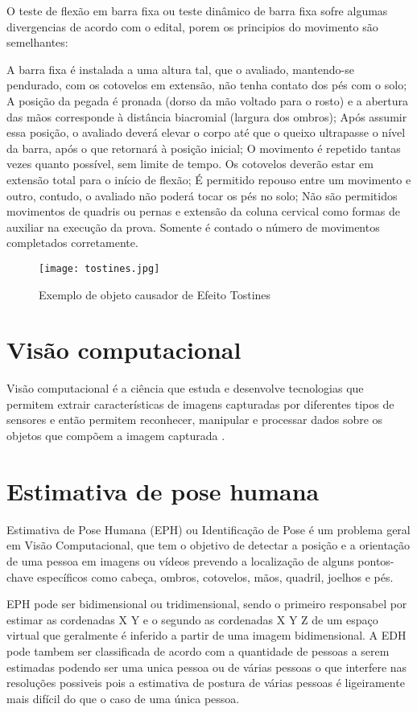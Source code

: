 O teste de flexão em barra fixa ou teste dinâmico de barra fixa sofre algumas divergencias de acordo com o edital, porem os principios do movimento são semelhantes:

A barra fixa é instalada a uma altura tal, que o avaliado, mantendo-se pendurado, com os cotovelos em extensão, não tenha contato dos pés com o solo;
A posição da pegada é pronada (dorso da mão voltado para o rosto) e a abertura das mãos corresponde à distância biacromial (largura dos ombros);
Após assumir essa posição, o avaliado deverá elevar o corpo até que o queixo ultrapasse o nível da barra, após o que retornará à posição inicial;
O movimento é repetido tantas vezes quanto possível, sem limite de tempo.
Os cotovelos deverão estar em extensão total para o início de flexão;
É permitido repouso entre um movimento e outro, contudo, o avaliado não poderá tocar os pés no solo;
Não são permitidos movimentos de quadris ou pernas e extensão da coluna cervical como formas de auxiliar na execução da prova.
Somente é contado o número de movimentos completados corretamente.

\begin{figure}[!htb]
	\centering
	\texttt{[image: tostines.jpg]}
	\caption{Exemplo de objeto causador de Efeito Tostines}
	\label{fig-tostines}
\end{figure}


\section[Visão computacional]{Visão computacional}
Visão computacional é a ciência que estuda e desenvolve tecnologias que permitem extrair características de imagens capturadas por diferentes tipos de sensores e então permitem reconhecer, manipular e processar dados sobre os objetos que compõem a imagem capturada \cite{VisaoComp} \cite{visao}.


\section[Visão computacional]{Estimativa de pose humana}
Estimativa de Pose Humana (EPH) ou Identificação de Pose é um problema geral em Visão Computacional, que tem o objetivo de detectar a posição e a orientação de uma pessoa  em imagens ou vídeos prevendo a localização de alguns pontos-chave específicos como  cabeça, ombros, cotovelos, mãos, quadril, joelhos e pés.\cite{edh}

EPH pode ser bidimensional ou tridimensional, sendo o primeiro responsabel por estimar as cordenadas X Y e o segundo as cordenadas X Y Z de um espaço virtual que geralmente é inferido a partir de uma imagem bidimensional. A EDH pode tambem ser classificada de acordo com a quantidade de pessoas a serem estimadas podendo ser uma unica pessoa ou de várias pessoas o que interfere nas resoluções possiveis pois a estimativa de postura de várias pessoas é ligeiramente mais difícil do que o caso de uma única pessoa.\cite{edhDeep}


